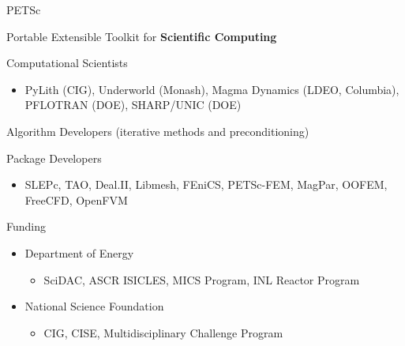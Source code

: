 \begin{frame}{PETSc}
\vspace*{-0.2cm}
\begin{center}
 Portable Extensible Toolkit for {\bf Scientific Computing}
\end{center}
\vspace*{-0.2cm}

  \begin{block}{Computational Scientists}
    \begin{itemize}\vspace*{-0.2cm}
    \item PyLith (CIG), Underworld (Monash), Magma Dynamics (LDEO, Columbia), PFLOTRAN (DOE), SHARP/UNIC (DOE)
    \end{itemize}
  \end{block}\vspace*{-0.2cm}
  
  \begin{block}{ Algorithm Developers (iterative methods and preconditioning)} \end{block}\vspace*{-0.4cm}

  \begin{block}{ Package Developers}
    \begin{itemize} \vspace*{-0.2cm}
    \item SLEPc, TAO, Deal.II, Libmesh, FEniCS, PETSc-FEM, MagPar, OOFEM, FreeCFD, OpenFVM
    \end{itemize}
  \end{block}\vspace*{-0.2cm}

  \begin{block}{Funding}
    \begin{itemize} \vspace*{-0.2cm}    
      \item Department of Energy
      \begin{itemize}\item SciDAC, ASCR ISICLES, MICS Program, INL Reactor Program
      \end{itemize}
    \item National Science Foundation
      \begin{itemize}\item CIG, CISE, Multidisciplinary Challenge Program
      \end{itemize}
    \end{itemize}
  \end{block}\vspace*{-0.2cm}


\end{frame}
